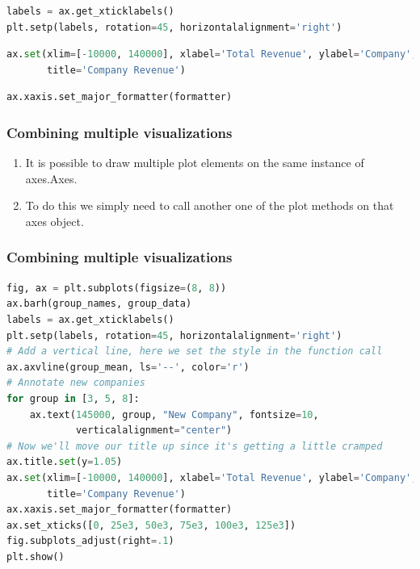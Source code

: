 \documentclass[UTF8,a4paper,12pt]{ctexart}  %
\providecommand{\tightlist}{\setlength{\itemsep}{0pt}\setlength{\parskip}{0pt}}
\begin{document}
\begin{lstlisting}[language=Python]
labels = ax.get_xticklabels()
plt.setp(labels, rotation=45, horizontalalignment='right')
\end{lstlisting}

\begin{lstlisting}[language=Python]
ax.set(xlim=[-10000, 140000], xlabel='Total Revenue', ylabel='Company',
       title='Company Revenue')
\end{lstlisting}

\begin{lstlisting}[language=Python]
ax.xaxis.set_major_formatter(formatter)
\end{lstlisting}

\hypertarget{combining-multiple-visualizations}{%
\subsubsection{Combining multiple visualizations}\label{combining-multiple-visualizations}}

\begin{enumerate}
\def\labelenumi{\arabic{enumi}.}
\tightlist
\item
  It is possible to draw multiple plot elements on the same instance
  of axes.Axes.
\item
  To do this we simply need to call another one of the plot methods on
  that axes object.
\end{enumerate}

\hypertarget{combining-multiple-visualizations-1}{%
\subsubsection{Combining multiple visualizations}\label{combining-multiple-visualizations-1}}

\begin{lstlisting}[language=Python]
fig, ax = plt.subplots(figsize=(8, 8))
ax.barh(group_names, group_data)
labels = ax.get_xticklabels()
plt.setp(labels, rotation=45, horizontalalignment='right')
# Add a vertical line, here we set the style in the function call
ax.axvline(group_mean, ls='--', color='r')
# Annotate new companies
for group in [3, 5, 8]:
    ax.text(145000, group, "New Company", fontsize=10,
            verticalalignment="center")
# Now we'll move our title up since it's getting a little cramped
ax.title.set(y=1.05)
ax.set(xlim=[-10000, 140000], xlabel='Total Revenue', ylabel='Company',
       title='Company Revenue')
ax.xaxis.set_major_formatter(formatter)
ax.set_xticks([0, 25e3, 50e3, 75e3, 100e3, 125e3])
fig.subplots_adjust(right=.1)
plt.show()
\end{lstlisting}
\end{document}
